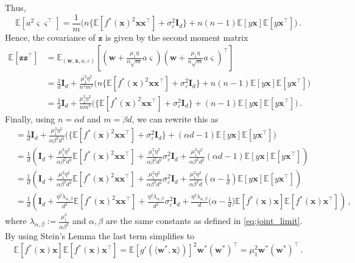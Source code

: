 Thus,
\[
    \mathbb E[a^2 \bm \varsigma \bm \varsigma^\top] = \frac{1}{m}\Big(n \Big \{\mathbb E[f^*(\bm x)^2 \bm x \bm x^\top]  + \sigma_{\varepsilon}^2\bm I_d\Big\}+ n(n-1)\mathbb E[y\bm x] \mathbb E[y \bm x^\top]\Big )\, .
\]
Hence, the covariance of $\bm z$ is given by the second moment matrix
\begin{align*}
    \mathbb E[\bm z \bm z^\top] &= \mathbb E_{(\bm w, \bm x, a, \varepsilon)}\left[\left(\bm w + \frac{\mu_1\eta}{n \sqrt{m}}a \bm \varsigma\right) \left(\bm w + \frac{\mu_1\eta}{n \sqrt{m}}a \bm \varsigma\right)^\top\right]\\
    &= \frac{1}{d} \bm I_d + \frac{\mu_1^2\eta^2}{n^2 m^2}\Big(n \Big \{\mathbb E[f^*(\bm x)^2 \bm x \bm x^\top]  + \sigma_{\varepsilon}^2\bm I_d\Big\}+ n(n-1)\mathbb E[y\bm x] \mathbb E[y \bm x^\top]\Big )\\
    &= \frac{1}{d} \bm I_d + \frac{\mu_1^2\eta^2}{n m^2}\Big(\Big \{\mathbb E[f^*(\bm x)^2 \bm x \bm x^\top]  + \sigma_{\varepsilon}^2\bm I_d\Big\}+ (n-1)\mathbb E[y\bm x] \mathbb E[y \bm x^\top]\Big )\, .
\end{align*}
Finally, using $n = \alpha d$ and $m = \beta d$, we can rewrite this as
\begin{align*}
    &= \frac{1}{d} \bm I_d + \frac{\mu_1^2\eta^2}{\alpha \beta^2 d^3}\Big(\Big \{\mathbb E[f^*(\bm x)^2 \bm x \bm x^\top]  + \sigma_{\varepsilon}^2\bm I_d\Big\}+ (\alpha d-1)\mathbb E[y\bm x] \mathbb E[y \bm x^\top]\Big )\\
    &= \frac{1}{d} \left(\bm I_d + \frac{\mu_1^2\eta^2}{\alpha \beta^2 d^2}\mathbb E[f^*(\bm x)^2 \bm x \bm x^\top]  + \frac{\mu_1^2\eta^2}{\alpha \beta^2 d^2}\sigma_{\varepsilon}^2\bm I_d + \frac{\mu_1^2\eta^2}{\alpha \beta^2 d^2}(\alpha d-1)\mathbb E[y\bm x] \mathbb E[y \bm x^\top] \right)\\
    &= \frac{1}{d} \left(\bm I_d + \frac{\mu_1^2\eta^2}{\alpha \beta^2 d^2}\mathbb E[f^*(\bm x)^2 \bm x \bm x^\top]  + \frac{\mu_1^2\eta^2}{\alpha \beta^2 d^2}\sigma_{\varepsilon}^2\bm I_d + \frac{\mu_1^2\eta^2}{\alpha \beta^2 d}\left(\alpha -\frac{1}{d}\right)\mathbb E[y\bm x] \mathbb E[y \bm x^\top] \right)\\
    &= \frac{1}{d} \left(\bm I_d + \frac{\eta^2\lambda_{\alpha, \beta}}{d^2}\mathbb E[f^*(\bm x)^2 \bm x\bm x^\top] + \frac{\eta^2\lambda_{\alpha, \beta}}{d^2}\sigma_\varepsilon^2 \bm I_d  + \frac{\eta^2\lambda_{\alpha, \beta}}{d}\Big(\alpha - \frac{1}{d}\Big)\mathbb E[f^*(\bm x)\bm x]\mathbb E[f^*(\bm x)\bm x^\top]\right)\, ,
\end{align*}
where $\lambda_{\alpha, \beta} := \frac{\mu_1^2}{\alpha \beta^2}$ and $\alpha, \beta$ are the same constants as defined in \cref{eq:joint_limit}. By using Stein's Lemma the last term simplifies to
\[
    \mathbb E[f^*(\bm x)\bm x]\mathbb E[f^*(\bm x)\bm x^\top] = \mathbb E[g'(\langle \bm w^*, \bm x\rangle)]^2\bm w^* (\bm w^*)^\top = \mu_1^2\bm w^* (\bm w^*)^\top\, .
\]

